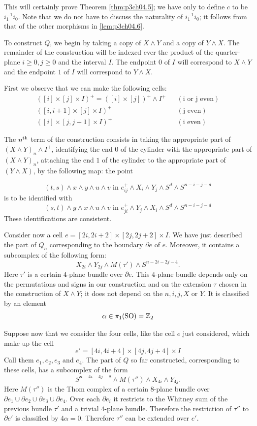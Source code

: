 \documentclass[../main]{subfiles}
\begin{document}
This will certainly prove Theorem \ref{thm:p3ch04.5}; we have only to define $c$ to be $i_1^{-1}i_0$. Note that we do not have to discuss the naturality of $i_1^{-1} i_0$; it follows from that of the other morphisms in \ref{lem:p3ch04.6}.

To construct $Q$, we begin by taking a copy of $X\wedge Y$ and a copy of $Y\wedge X$. The remainder of the construction will be indexed ever the product
of the quarter-plane $i\geq 0,j\geq 0$ and the interval $I$. The endpoint $0$ of $I$ will correspond to $X\wedge Y$ and the endpoint $1$ of $I$ will correspond to $Y\wedge X$.

First we observe that we can make the following cells:
\begin{align*}
    ([i]\times[j]\times I)^+=([i]\times [j])^+\wedge I^+ && (\text{i or j even})\\
    ([i,i+1]\times [j]\times I)^+ && (\text{j even})\\
    ([i]\times [j,j+1]\times I)^+ && (\text{i even})
\end{align*}

The $n^{\text{th}}$ term of the construction consists in taking the appropriate part of $(X\wedge Y)_n \wedge I^+$, identifying the end $0$ of the cylinder with the appropriate part of $(X\wedge Y)_n$, attaching the end $1$ of the cylinder to the appropriate part of $(Y\wedge X)$, by the following map: the point

\[(t,s)\wedge x\wedge y\wedge u\wedge v\text{  in  }e_{ij}^+ \wedge X_i\wedge Y_j \wedge S^d \wedge S^{n-i-j-d}\]
is to be identified with 
\[(s,t)\wedge y\wedge x\wedge u\wedge v\text{  in  }e_{ji}^+ \wedge Y_j\wedge X_i \wedge S^d \wedge S^{n-i-j-d}\]
These identifications are consistent.

Consider now a cell $e=[2i,2i+2]\times [2j,2j+2]\times I$. We have just described the part of $Q_n$ corresponding to the boundary $\partial e$ of $e$. Moreover, it contains a subcomplex of the following form:
\[X_{2i}\wedge Y_{2j}\wedge M(\tau') \wedge S^{n-2i-2j-4}.\]
Here $\tau'$ is a certain $4$-plane bundle over $\partial e$. This $4$-plane bundle depends only on the permutations and signs in our construction and on the extension $\tau$ chosen in the construction of $X\wedge Y$; it does not depend on the $n,i,j,X$ or $Y$. It is classified by an element \[\alpha\in \pi_1(\mathrm{SO}) = \mathbb{Z}_2\]

Suppose now that we consider the four cells, like the cell $e$ just considered, which make up the cell \[e'=[4i,4i+4]\times [4j,4j+4]\times I \]
Call them $e_1,e_2,e_3$ and $e_4$. The part of $Q$ so far constructed, corresponding to these cells, has a subcomplex of the form 
\[S^{n-4i-4j-8}\wedge M(\tau'')\wedge X_{4i}\wedge Y_{4j} .\]
Here $M(\tau'')$ is the Thom complex of a certain $8$-plane bundle over \newline $\partial e_1\cup \partial e_2\cup \partial e_3\cup \partial e_4$. Over each $\partial e_i$ it restricts to the Whitney sum of the previous bundle $\tau'$ and a trivial $4$-plane bundle. Therefore the restriction of $\tau''$ to $\partial e'$ is classified by $4\alpha=0$. Therefore $\tau''$ can be extended over $e'$.
\end{document}
